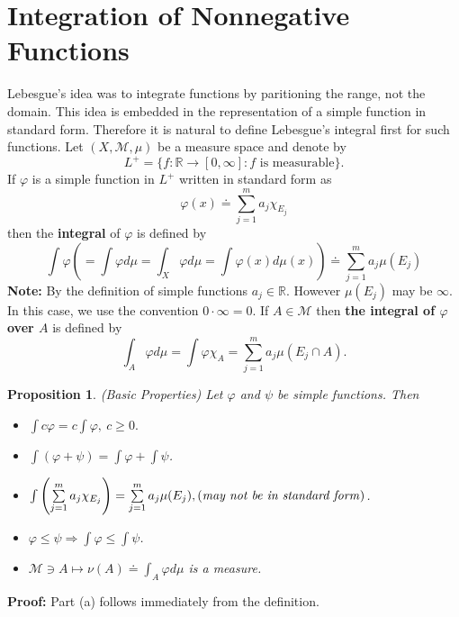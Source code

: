 \documentclass[12pt]{report}
\newtheorem{prop}[theorem]{Proposition}
\begin{document}
\section{Integration of Nonnegative Functions}
 Lebesgue's idea was to integrate functions by paritioning
the range, not the domain.  This idea is embedded in the representation
of a simple function in standard form.  Therefore it is natural to define
Lebesgue's integral first for such functions.  Let $(X, \mathcal{M}, \mu)$
be a measure space and denote by 
\[ L^+ = \{f: \mathbb{R} \longrightarrow [0, \infty]: f \mbox{ is
measurable}\}.
\] If $\varphi$ is a simple function in $L^+$ written in standard form as
\[
\varphi (x) \doteq \sum^m_{j=1} a_j \chi_{E_j}
\] 
then the \textbf{integral} of $\varphi$ is defined by 
\begin{equation}
\label{eq:step-funct-int}
\int \varphi \left ( = \int \varphi d \mu = \int_X \varphi d\mu = \int
\varphi (x) d\mu(x) \right ) \doteq \sum^m_{j=1} a_j \mu(E_j) \tag{1}
\end{equation}
\textbf{Note:}  By the definition of simple functions $a_j \in
\mathbb{R}$.  However
$\mu(E_j)$ may  be $\infty$. In this case, we use the convention $0
\cdot \infty = 0$.  If $A \in \mathcal{M}$ then \textbf{the integral of
$\varphi$ over $A$} is defined by
\[
\int_A \varphi d\mu =\int \varphi \chi_A = \sum^m _{j=1} a_j \mu(E_j
\cap A).
\]

\begin{prop} (Basic Properties)  Let $\varphi$ and $\psi$ be
simple functions.  Then
\begin{itemize}
\item[(a)] $\int c \varphi = c \int \varphi, \ c \ge 0.$
\item[(b)] $\int (\varphi + \psi) = \int \varphi + \int \psi$.
\item[(c)] $\int \left ( \sum\limits^m_{j=1} a_j \chi_{E_j} \right ) =
\sum\limits^m_{j=1} a_j \mu(E_j), \mbox{(\textit{may not be in
standard form})}$.
\item[(d)]  $\varphi \le \psi \Longrightarrow \int \varphi \le \int \psi$.
\item[(e)] $\mathcal{M} \ni A \longmapsto \nu(A) \doteq \int_A \varphi
d \mu$ is a measure.
\end{itemize}
\end{prop}
\textbf{Proof:}
  Part (a) follows immediately from the definition.
\end{document}
